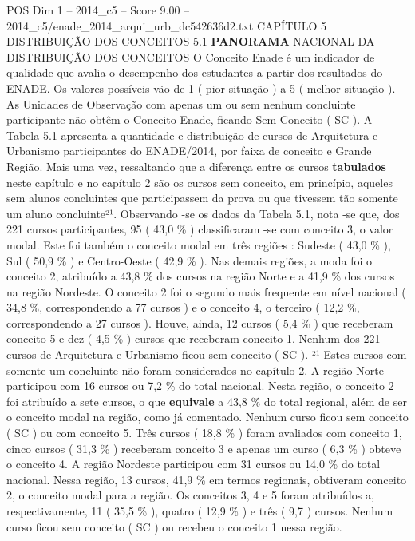 \begin{textsample}{POS Dim 1 – 2014\_c5 – Score 9.00 – 2014\_c5/enade\_2014\_arqui\_urb\_dc542636d2.txt}  \label{ex:f1_pos_110}
CAPÍTULO 5 DISTRIBUIÇÃO DOS CONCEITOS 5.1 \textbf{PANORAMA} NACIONAL DA DISTRIBUIÇÃO DOS CONCEITOS O Conceito Enade é um indicador de qualidade que avalia o desempenho dos estudantes a partir dos resultados do ENADE.
Os valores possíveis vão de 1 ( pior situação ) a 5 ( melhor situação ).
As Unidades de Observação com apenas um ou sem nenhum concluinte participante não obtêm o Conceito Enade, ficando Sem Conceito ( SC ).
A Tabela 5.1 apresenta a quantidade e distribuição de cursos de Arquitetura e Urbanismo participantes do ENADE/2014, por faixa de conceito e Grande Região.
Mais uma vez, ressaltando que a diferença entre os cursos \textbf{tabulados} neste capítulo e no capítulo 2 são os cursos sem conceito, em princípio, aqueles sem alunos concluintes que participassem da prova ou que tivessem tão somente um aluno concluinte²¹.
Observando -se os dados da Tabela 5.1, nota -se que, dos 221 cursos participantes, 95 ( 43,0 \% ) classificaram -se com conceito 3, o valor modal.
Este foi também o conceito modal em três regiões : Sudeste ( 43,0 \% ), Sul ( 50,9 \% ) e Centro-Oeste ( 42,9 \% ).
Nas demais regiões, a moda foi o conceito 2, atribuído a 43,8 \% dos cursos na região Norte e a 41,9 \% dos cursos na região Nordeste.
O conceito 2 foi o segundo mais frequente em nível nacional ( 34,8 \%, correspondendo a 77 cursos ) e o conceito 4, o terceiro ( 12,2 \%, correspondendo a 27 cursos ).
Houve, ainda, 12 cursos ( 5,4 \% ) que receberam conceito 5 e dez ( 4,5 \% ) cursos que receberam conceito 1.
Nenhum dos 221 cursos de Arquitetura e Urbanismo ficou sem conceito ( SC ). ²¹ Estes cursos com somente um concluinte não foram considerados no capítulo 2.
A região Norte participou com 16 cursos ou 7,2 \% do total nacional.
Nesta região, o conceito 2 foi atribuído a sete cursos, o que \textbf{equivale} a 43,8 \% do total regional, além de ser o conceito modal na região, como já comentado.
Nenhum curso ficou sem conceito ( SC ) ou com conceito 5.
Três cursos ( 18,8 \% ) foram avaliados com conceito 1, cinco cursos ( 31,3 \% ) receberam conceito 3 e apenas um curso ( 6,3 \% ) obteve o conceito 4.
A região Nordeste participou com 31 cursos ou 14,0 \% do total nacional.
Nessa região, 13 cursos, 41,9 \% em termos regionais, obtiveram conceito 2, o conceito modal para a região.
Os conceitos 3, 4 e 5 foram atribuídos a, respectivamente, 11 ( 35,5 \% ), quatro ( 12,9 \% ) e três ( 9,7 ) cursos.
Nenhum curso ficou sem conceito ( SC ) ou recebeu o conceito 1 nessa região.

\end{textsample}

